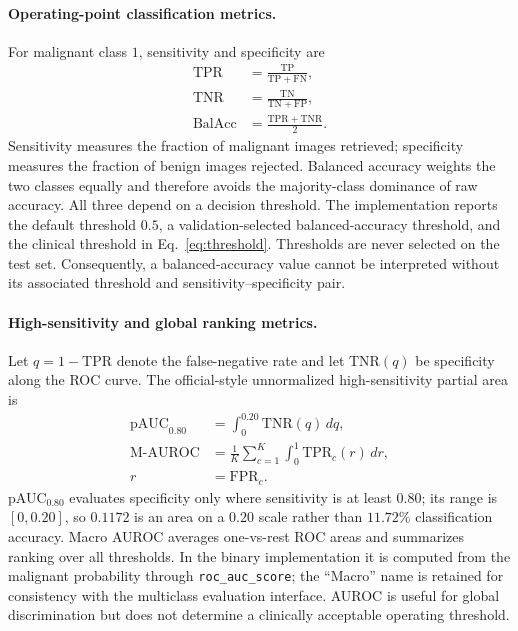 \documentclass[letterpaper]{article}
\begin{document}
\paragraph{Operating-point classification metrics.}
For malignant class $1$, sensitivity and specificity are
\begin{equation}\label{eq:appendix_operating_metrics}
\begin{aligned}
\mathrm{TPR}&=\frac{\mathrm{TP}}{\mathrm{TP}+\mathrm{FN}},\\
\mathrm{TNR}&=\frac{\mathrm{TN}}{\mathrm{TN}+\mathrm{FP}},\\
\mathrm{BalAcc}&=\frac{\mathrm{TPR}+\mathrm{TNR}}{2}.
\end{aligned}
\end{equation}
Sensitivity measures the fraction of malignant images retrieved; specificity
measures the fraction of benign images rejected. Balanced accuracy weights the
two classes equally and therefore avoids the majority-class dominance of raw
accuracy. All three depend on a decision threshold. The implementation reports
the default threshold $0.5$, a validation-selected balanced-accuracy threshold,
and the clinical threshold in Eq.~\ref{eq:threshold}. Thresholds are never
selected on the test set. Consequently, a balanced-accuracy value cannot be
interpreted without its associated threshold and sensitivity--specificity pair.

\paragraph{High-sensitivity and global ranking metrics.}
Let $q=1-\mathrm{TPR}$ denote the false-negative rate and let
$\mathrm{TNR}(q)$ be specificity along the ROC curve. The official-style
unnormalized high-sensitivity partial area is
\begin{equation}\label{eq:appendix_ranking_metrics}
\begin{aligned}
\mathrm{pAUC}_{0.80}&=\int_{0}^{0.20}\mathrm{TNR}(q)\,dq,\\
\mathrm{M\text{-}AUROC}&=\frac{1}{K}\sum_{c=1}^{K}
\int_{0}^{1}\mathrm{TPR}_c(r)\,dr,\\
r&=\mathrm{FPR}_c.
\end{aligned}
\end{equation}
pAUC$_{0.80}$ evaluates specificity only where sensitivity is at least $0.80$;
its range is $[0,0.20]$, so $0.1172$ is an area on a $0.20$ scale rather than
$11.72\%$ classification accuracy. Macro AUROC averages one-vs-rest ROC areas
and summarizes ranking over all thresholds. In the binary implementation it is
computed from the malignant probability through \texttt{roc\_auc\_score}; the
``Macro'' name is retained for consistency with the multiclass evaluation
interface. AUROC is useful for global discrimination but does not determine a
clinically acceptable operating threshold.
\end{document}
